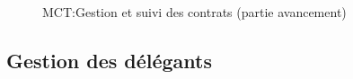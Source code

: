 \documentclass[a4paper]{report}
\begin{document}
\begin{doublespace}
	\begin{figure}[H]
		\begin{center}
			\caption{MCT:Gestion et suivi des contrats (partie avancement)}
		\end{center}
	\end{figure}

	\subsection{Gestion des délégants}


\end{doublespace}
\end{document}
